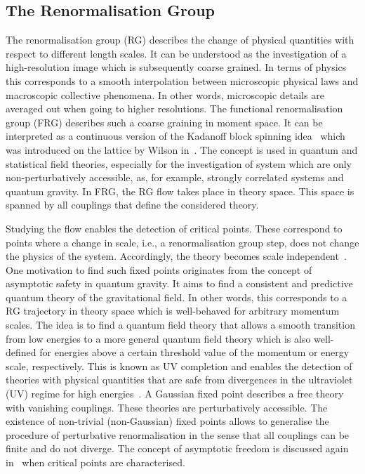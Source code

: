 \documentclass[paper=a4,11pt,bibliography=totoc]{scrartcl}
\begin{document}
\subsection{The Renormalisation Group}
\label{sec:ren}
%
The renormalisation group (RG) describes the change of physical quantities with respect to different length scales. It can be understood as the investigation of a high-resolution image which is subsequently coarse grained. In terms of physics this corresponds to a smooth interpolation between microscopic physical laws and macroscopic collective phenomena. In other words, microscopic details are averaged out when going to higher resolutions. The functional renormalisation group (FRG) describes such a coarse graining in moment space. It can be interpreted as a continuous version of the Kadanoff block spinning idea~\cite{Kadanoff} which was introduced on the lattice by Wilson in~\cite{Wilson1971, Wilson1971b}. The concept is used in quantum and statistical field theories, especially for the investigation of system which are only non-perturbatively accessible, as, for example, strongly correlated systems and quantum gravity. In FRG, the RG flow takes place in theory space. This space is spanned by all couplings that define the considered theory.

Studying the flow enables the detection of critical points. These correspond to points where a change in scale, i.e., a renormalisation group step, does not change the physics of the system. Accordingly, the theory becomes scale independent~\cite{Pawlowski2018, WikiFrg}. One motivation to find such fixed points originates from the concept of asymptotic safety in quantum gravity. It aims to find a consistent and predictive quantum theory of the gravitational field. In other words, this corresponds to a RG trajectory in theory space which is well-behaved for arbitrary momentum scales. The idea is to find a quantum field theory that allows a smooth transition from low energies to a more general quantum field theory which is also well-defined for energies above a certain threshold value of the momentum or energy scale, respectively. This is known as UV completion and enables the detection of theories with physical quantities that are safe from divergences in the ultraviolet (UV) regime for high energies~\cite{WikiAsym}. A Gaussian fixed point describes a free theory with vanishing couplings. These theories are perturbatively accessible. The existence of non-trivial (non-Gaussian) fixed points allows to generalise the procedure of perturbative renormalisation in the sense that all couplings can be finite and do not diverge. The concept of asymptotic freedom is discussed again in~ when critical points are characterised.
%
\end{document}
